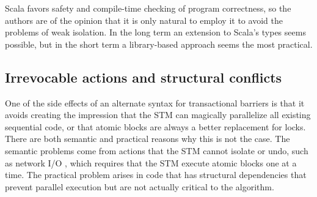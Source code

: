 Scala favors safety and compile-time checking of program correctness,
so the authors are of the opinion that it is only natural to employ it
to avoid the problems of weak isolation.  In the long term an extension
to Scala's types seems possible, but in the short term a library-based
approach seems the most practical.

\subsection*{Irrevocable actions and structural conflicts}

One of the side effects of an alternate syntax for transactional barriers is
that it avoids creating the impression that the STM can magically parallelize
all existing sequential code, or that atomic blocks are always a better
replacement for locks.  There are both semantic and practical reasons
why this is not the case.  The semantic problems come from actions that the STM
cannot isolate or undo, such as network I/O
, which requires that the STM execute atomic blocks one
at a time.  The practical problem arises in code that has structural
dependencies that prevent parallel execution but are not actually critical to
the algorithm.




